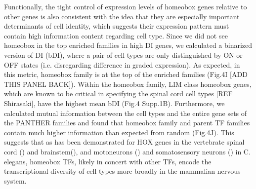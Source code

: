 Functionally, the tight control of expression levels of homeobox genes relative to other genes is also consistent with the idea that they are especially important determinants of cell identity, which suggests their expression pattern must contain high information content regarding cell type. Since we did not see homeobox in the top enriched families in high DI genes, we calculated a binarized version of DI (bDI), where a pair of cell types are only distinguished by ON or OFF states (i.e. disregarding difference in graded expression). As expected, in this metric, homeobox family is at the top of the enriched families (Fig.4I [ADD THIS PANEL BACK]). Within the homeobox family, LIM class homeobox genes, which are known to be critical in specifying the spinal cord cell types [REF Shirasaki], have the highest mean bDI (Fig.4 Supp.1B). Furthermore, we calculated mutual information between the cell types and the entire gene sets of the PANTHER families and found that homeobox family and parent TF families contain much higher information than expected from random (Fig.4J). This suggests that as has been demonstrated for HOX genes in the vertebrate spinal cord () and brainstem(), and motoneurons () and somatosensory neurons () in C. elegans, homeobox TFs, likely in concert with other TFs, encode the transcriptional diversity of cell types more broadly in the mammalian nervous system.
